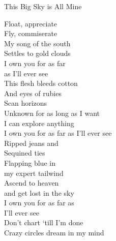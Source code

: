This Big Sky is All Mine

Float, appreciate\\
Fly, commiserate\\
My song of the south\\
Settles to gold clouds\\
I own you for as far\\
as I'll ever see\\
This flesh bleeds cotton\\
And eyes of rubies\\
Scan horizons\\
Unknown for as long as I want\\
I can explore anything\\
I own you for as far as I'll ever see\\
Ripped jeans and\\
Sequined ties\\
Flapping blue in\\
my expert tailwind\\
Ascend to heaven\\
and get lost in the sky\\
I own you for as far as\\
I'll ever see\\
Don't chart `till I'm done\\
Crazy circles dream in my mind\\

